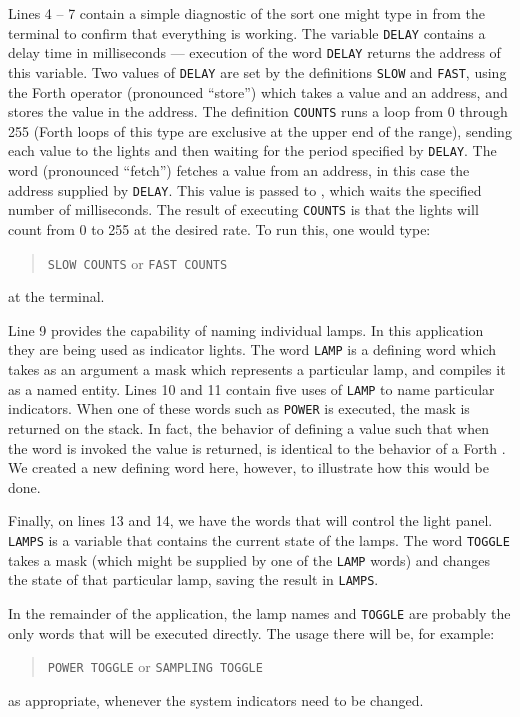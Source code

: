 Lines 4 -- 7 contain a simple diagnostic of the sort one might type
in from the terminal to confirm that everything is working. The
variable \texttt{DELAY} contains a delay time in milliseconds ---
execution of the word \texttt{DELAY} returns the address of this
variable. Two values of \texttt{DELAY} are set by the definitions
\texttt{SLOW} and \texttt{FAST}, using the Forth operator \word{!}
(pronounced ``store'') which takes a value and an address, and stores
the value in the address. The definition \texttt{COUNTS} runs a loop
from 0 through 255 (Forth loops of this type are exclusive at the
upper end of the range), sending each value to the lights and then
waiting for the period specified by \texttt{DELAY}. The word
 (pronounced ``fetch'') fetches a value from an address,
in this case the address supplied by \texttt{DELAY}. This value is
passed to , which waits the specified number of
milliseconds. The result of executing \texttt{COUNTS} is that the
lights will count from 0 to 255 at the desired rate. To run this,
one would type:
\begin{quote}
	\texttt{SLOW COUNTS} \quad or \quad \texttt{FAST COUNTS}
\end{quote}
at the terminal.

Line 9 provides the capability of naming individual lamps. In this
application they are being used as indicator lights. The word
\texttt{LAMP} is a defining word which takes as an argument a mask
which represents a particular lamp, and compiles it as a named
entity. Lines 10 and 11 contain five uses of \texttt{LAMP} to name
particular indicators. When one of these words such as \texttt{POWER}
is executed, the mask is returned on the stack. In fact, the behavior
of defining a value such that when the word is invoked the value is
returned, is identical to the behavior of a Forth .
We created a new defining word here, however, to illustrate how this
would be done.

Finally, on lines 13 and 14, we have the words that will control the
light panel. \texttt{LAMPS} is a variable that contains the current
state of the lamps. The word \texttt{TOGGLE} takes a mask (which might
be supplied by one of the \texttt{LAMP} words) and changes the state
of that particular lamp, saving the result in \texttt{LAMPS}.

In the remainder of the application, the lamp names and \texttt{TOGGLE}
are probably the only words that will be executed directly. The usage
there will be, for example:
\begin{quote}
	\texttt{POWER TOGGLE} \quad or \quad \texttt{SAMPLING TOGGLE}
\end{quote}
as appropriate, whenever the system indicators need to be changed.

